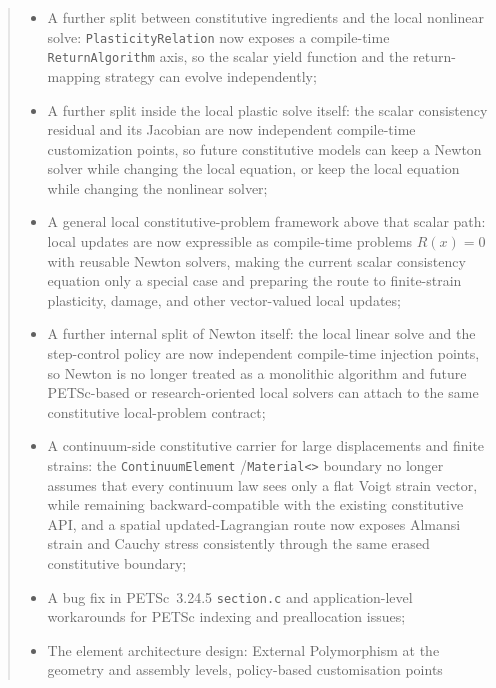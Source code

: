 \documentclass[11pt,a4paper]{report}
\theoremstyle{definition}
\begin{document}
\begin{abstract}
\begin{itemize}[nosep]
        a constitutive protocol sampler and VTK curve writer to generate
        strain--stress hysteresis loops for direct visual inspection of
        nonlinear materials;
  \item A further split between constitutive ingredients and the local
        nonlinear solve: \texttt{PlasticityRelation} now exposes a
        compile-time \texttt{ReturnAlgorithm} axis, so the scalar yield
        function and the return-mapping strategy can evolve independently;
  \item A further split inside the local plastic solve itself: the scalar
        consistency residual and its Jacobian are now independent compile-time
        customization points, so future constitutive models can keep a Newton
        solver while changing the local equation, or keep the local equation
        while changing the nonlinear solver;
  \item A general local constitutive-problem framework above that scalar path:
        local updates are now expressible as compile-time problems
        $R(x)=0$ with reusable Newton solvers, making the current scalar
        consistency equation only a special case and preparing the route to
        finite-strain plasticity, damage, and other vector-valued local
        updates;
  \item A further internal split of Newton itself: the local linear solve and
        the step-control policy are now independent compile-time injection
        points, so Newton is no longer treated as a monolithic algorithm and
        future PETSc-based or research-oriented local solvers can attach to the
        same constitutive local-problem contract;
  \item A continuum-side constitutive carrier for large displacements and
        finite strains: the \texttt{ContinuumElement} /\texttt{Material<>}
        boundary no longer assumes that every continuum law sees only a flat
        Voigt strain vector, while remaining backward-compatible with the
        existing constitutive API, and a spatial updated-Lagrangian route now
        exposes Almansi strain and Cauchy stress consistently through the same
        erased constitutive boundary;
  \item A bug fix in PETSc~3.24.5 \texttt{section.c} and application-level
        workarounds for PETSc indexing and preallocation issues;
  \item The element architecture design: External Polymorphism at the geometry
        and assembly levels, policy-based customisation points

\end{itemize}
\end{abstract}
\end{document}
